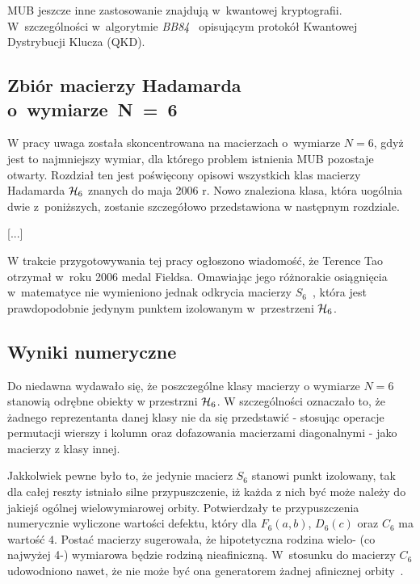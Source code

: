 \documentclass[a4paper,12pt,twoside]{article}
\newcommand{\HADAMARDS}[1]{{\cal H}_{#1}}
\begin{document}
MUB jeszcze inne zastosowanie znajduj\k{a} w~kwantowej kryptografii. W~szczeg\'{o}lno\'{s}ci w~algorytmie \emph{BB84}~\cite{BB84} opisuj\k{a}cym protok\'{o}{\l} Kwantowej Dystrybucji Klucza (QKD).


\subsection*{Zbi\'{o}r macierzy Hadamarda o~wymiarze~N~=~6}

W pracy uwaga zosta{\l}a skoncentrowana na macierzach o~wymiarze $N=6$, gdy\.{z} jest to najmniejszy wymiar, dla kt\'{o}rego problem istnienia MUB pozostaje otwarty. Rozdzia{\l} ten jest po\'{s}wi\k{e}cony opisowi wszystkich klas macierzy Hadamarda $\HADAMARDS{6}$ znanych do maja 2006 r. Nowo znaleziona klasa, kt\'{o}ra uog\'{o}lnia dwie z~poni\.{z}szych, zostanie szczeg\'{o}{\l}owo przedstawiona w nast\k{e}pnym rozdziale.

[...]

W trakcie przygotowywania tej pracy og{\l}oszono wiadomo\'{s}\'{c}, \.{z}e Terence Tao otrzyma{\l} w~roku 2006 medal Fieldsa. Omawiaj\k{a}c jego r\'{o}\.{z}norakie osi\k{a}gni\k{e}cia w~matematyce nie wymieniono jednak odkrycia macierzy $S_6$~\cite{Ta04}, kt\'{o}ra jest prawdopodobnie jedynym punktem izolowanym w~przestrzeni $\HADAMARDS{6}$.



\subsection*{Wyniki numeryczne}

Do niedawna wydawa{\l}o si\k{e}, \.{z}e poszczeg\'{o}lne klasy macierzy o wymiarze $N=6$ stanowi\k{a} odr\k{e}bne obiekty w przestrzni $\HADAMARDS{6}$. W szczeg\'{o}lno\'{s}ci oznacza{\l}o to, \.{z}e \.{z}adnego reprezentanta danej klasy nie da si\k{e} przedstawi\'{c} - stosuj\k{a}c operacje permutacji wierszy i kolumn oraz dofazowania macierzami diagonalnymi - jako macierzy z klasy innej.

Jakkolwiek pewne by{\l}o to, \.{z}e jedynie macierz $S_6$ stanowi punkt izolowany, tak dla ca{\l}ej reszty istnia{\l}o silne przypuszczenie, i\.{z} ka\.{z}da z nich by\'{c} mo\.{z}e nale\.{z}y do jakiej\'{s} og\'{o}lnej wielowymiarowej orbity. Potwierdza{\l}y te przypuszczenia numerycznie wyliczone warto\'{s}ci defektu, kt\'{o}ry dla $F_6(a, b)$, $D_6(c)$ oraz $C_6$ ma warto\'{s}\'{c} $4$. Posta\'{c} macierzy sugerowa{\l}a, \.{z}e hipotetyczna rodzina wielo- (co najwy\.{z}ej 4-) wymiarowa b\k{e}dzie rodzin\k{a} nieafiniczn\k{a}. W~stosunku do macierzy $C_6$ udowodniono nawet, \.{z}e nie mo\.{z}e by\'{c} ona generatorem \.{z}adnej afinicznej orbity~\cite{TZ07}.
\end{document}
